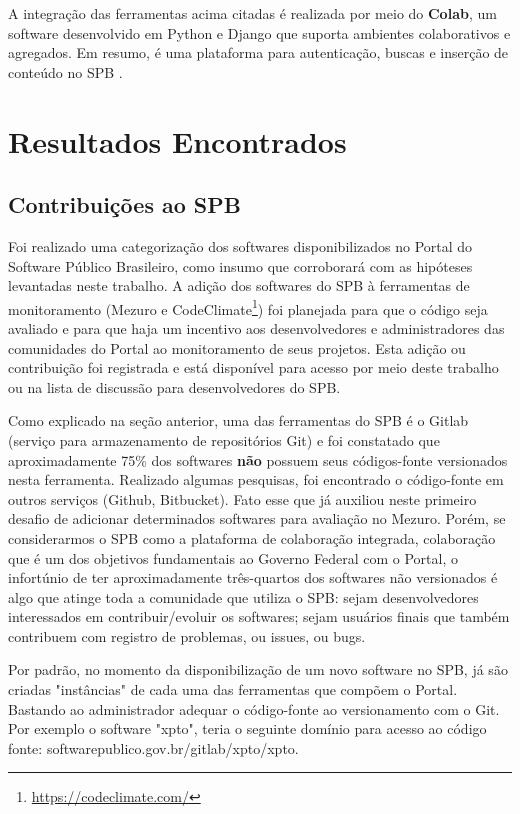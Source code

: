 A integração das ferramentas acima citadas é realizada por meio do
\textbf{Colab}, um software desenvolvido em Python e Django que suporta
ambientes colaborativos e agregados. Em resumo, é uma plataforma para
autenticação, buscas e inserção de conteúdo no SPB \cite{aboutSPB}.

\section{Resultados Encontrados}

\subsection{Contribuições ao SPB}

Foi realizado uma categorização dos softwares disponibilizados no Portal do
Software Público Brasileiro, como insumo que corroborará com as hipóteses
levantadas neste trabalho. A adição dos softwares do SPB à ferramentas de
monitoramento (Mezuro e CodeClimate\footnote{\url{https://codeclimate.com/}})
foi planejada para que o código seja avaliado e para que haja um incentivo aos
desenvolvedores e administradores das comunidades do Portal ao monitoramento de
seus projetos. Esta adição ou contribuição foi registrada e está disponível
para acesso por meio deste trabalho ou na lista de discussão para
desenvolvedores do SPB.

Como explicado na seção anterior, uma das ferramentas do SPB é o Gitlab
(serviço para armazenamento de repositórios Git) e foi constatado que
aproximadamente 75\% dos softwares \textbf{não} possuem seus códigos-fonte
versionados nesta ferramenta. Realizado algumas pesquisas, foi encontrado o
código-fonte em outros serviços (Github, Bitbucket). Fato esse que já auxiliou
neste primeiro desafio de adicionar determinados softwares para avaliação no
Mezuro. Porém, se considerarmos o SPB como a plataforma de colaboração
integrada, colaboração que é um dos objetivos fundamentais ao Governo Federal
com o Portal, o infortúnio de ter aproximadamente três-quartos dos softwares
não versionados é algo que atinge toda a comunidade que utiliza o SPB: sejam
desenvolvedores interessados em contribuir/evoluir os softwares; sejam usuários
finais que também contribuem com registro de problemas, ou issues, ou bugs.

Por padrão, no momento da disponibilização de um novo software no SPB, já são
criadas "instâncias" de cada uma das ferramentas que compõem o Portal. Bastando
ao administrador adequar o código-fonte ao versionamento com o Git. Por exemplo
o software "xpto", teria o seguinte domínio para acesso ao código fonte:
softwarepublico.gov.br/gitlab/xpto/xpto.

